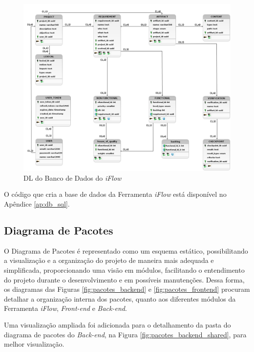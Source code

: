 \begin{figure}[H]
    \begin{center}
        \caption{{DL do Banco de Dados do \textit{iFlow}}}
        \label{fig:diagrama_logico}
        \includegraphics[scale=0.37]{figuras/Proposta/Logico_iFlow.png}
    \end{center}
\end{figure}

O código que cria a base de dados da Ferramenta \textit{iFlow} está disponível no Apêndice \ref{ap:db_sql}.

\subsection{Diagrama de Pacotes}

O Diagrama de Pacotes é representado como um esquema estático, possibilitando a visualização e a organização do projeto de maneira mais adequada e simplificada, proporcionando uma visão em módulos, facilitando o entendimento do projeto durante o desenvolvimento e em possíveis manutenções. Dessa forma, os diagramas das Figuras \ref{fig:pacotes_backend} e \ref{fig:pacotes_frontend} procuram detalhar a organização interna dos pacotes, quanto aos diferentes módulos da Ferramenta \textit{iFlow}, \textit{Front-end} e \textit{Back-end}.

Uma visualização ampliada foi adicionada para o detalhamento da pasta do diagrama de pacotes do \textit{Back-end}, na Figura \ref{fig:pacotes_backend_shared}, para melhor visualização.

